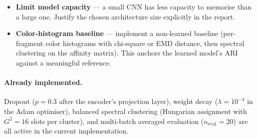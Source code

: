 \documentclass[12pt, a4paper]{article}
\begin{document}
\begin{itemize}
    \item \textbf{Limit model capacity} — a small CNN has less capacity to memorise than
          a large one. Justify the chosen architecture size explicitly in the report.
    \item \textbf{Color-histogram baseline} — implement a non-learned baseline
          (per-fragment color histograms with chi-square or EMD distance, then
          spectral clustering on the affinity matrix). This anchors the learned
          model's ARI against a meaningful reference.
\end{itemize}

\paragraph{Already implemented.}
Dropout ($p = 0.3$ after the encoder's projection layer), weight decay
($\lambda = 10^{-4}$ in the Adam optimiser), balanced spectral clustering (Hungarian
assignment with $G^2 = 16$ slots per cluster), and multi-batch averaged evaluation
($n_{\text{eval}} = 20$) are all active in the current implementation.

\printbibliography
\end{document}
